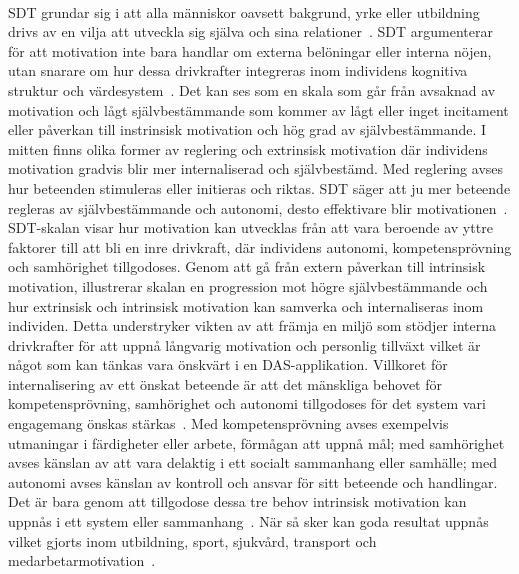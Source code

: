 \paragraph{}
\hspace{-11}SDT grundar sig i att alla människor oavsett bakgrund, yrke eller utbildning drivs av en vilja att utveckla sig själva och sina relationer~\cite{Cwil2018}.
SDT argumenterar för att motivation inte bara handlar om externa belöningar eller interna nöjen, utan snarare om hur dessa drivkrafter integreras inom individens kognitiva struktur och värdesystem~\cite{Cwil2018}.
Det kan ses som en skala som går från avsaknad av motivation och lågt självbestämmande som kommer av lågt eller inget incitament eller påverkan till instrinsisk motivation och hög grad av självbestämmande.
I mitten finns olika former av reglering och extrinsisk motivation där individens motivation gradvis blir mer internaliserad och självbestämd.
Med reglering avses hur beteenden stimuleras eller initieras och riktas.
SDT säger att ju mer beteende regleras av självbestämmande och autonomi, desto effektivare blir motivationen~\cite{Cwil2018}.
SDT-skalan visar hur motivation kan utvecklas från att vara beroende av yttre faktorer till att bli en inre drivkraft, där individens autonomi, kompetensprövning och samhörighet tillgodoses.
Genom att gå från extern påverkan till intrinsisk motivation, illustrerar skalan en progression mot högre självbestämmande och hur extrinsisk och intrinsisk motivation kan samverka och internaliseras inom individen.
Detta understryker vikten av att främja en miljö som stödjer interna drivkrafter för att uppnå långvarig motivation och personlig tillväxt vilket är något som kan tänkas vara önskvärt i en DAS-applikation.
Villkoret för internalisering av ett önskat beteende är att det mänskliga behovet för kompetensprövning, samhörighet och autonomi tillgodoses för det system vari engagemang önskas stärkas~\cite{Cwil2018}.
Med kompetensprövning avses exempelvis utmaningar i färdigheter eller arbete, förmågan att uppnå mål; med samhörighet avses känslan av att vara delaktig i ett socialt sammanhang eller samhälle; med autonomi avses känslan av kontroll och ansvar för sitt beteende och handlingar.
Det är bara genom att tillgodose dessa tre behov intrinsisk motivation kan uppnås i ett system eller sammanhang~\cite{Cwil2018}.
När så sker kan goda resultat uppnås vilket gjorts inom utbildning, sport, sjukvård, transport och medarbetarmotivation~\cite{Cwil2018}.

